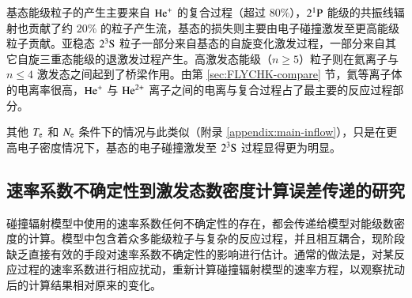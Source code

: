 基态能级粒子的产生主要来自 ${\rm He}^+$ 的复合过程（超过 $80\%$），$2^1{\rm P}$ 能级的共振线辐射也贡献了约 $20\%$ 的粒子产生流，基态的损失则主要由电子碰撞激发至更高能级粒子贡献。亚稳态 $2^3{\rm S}$ 粒子一部分来自基态的自旋变化激发过程，一部分来自其它自旋三重态能级的退激发过程产生。高激发态能级（$n\ge5$）粒子则在氦离子与 $n\le4$ 激发态之间起到了桥梁作用。由第 \ref{sec:FLYCHK-compare} 节，氦等离子体的电离率很高，${\rm He}^+$ 与 ${\rm He}^{2+}$ 离子之间的电离与复合过程占了最主要的反应过程部分。

其他 $T_{\rm e}$ 和 $N_{\rm e}$ 条件下的情况与此类似（附录 \ref{appendix:main-inflow}），只是在更高电子密度情况下，基态的电子碰撞激发至 $2^3{\rm S}$ 过程显得更为明显。

\subsection{速率系数不确定性到激发态数密度计算误差传递的研究}
\label{sec:chap04:uncertainty-transport}

碰撞辐射模型中使用的速率系数任何不确定性的存在，都会传递给模型对能级数密度的计算。模型中包含着众多能级粒子与复杂的反应过程，并且相互耦合，现阶段缺乏直接有效的手段对速率系数不确定性的影响进行估计。通常的做法是，对某反应过程的速率系数进行相应扰动，重新计算碰撞辐射模型的速率方程，以观察扰动后的计算结果相对原来的变化\cite{Andrew2000PPCFSensitivity}。

